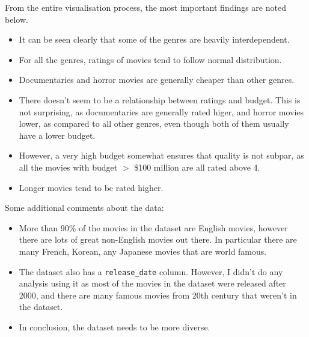 \documentclass[10pt]{article}
\begin{document}
\begin{multicols}{2}
From the entire visualisation process, the most important findings are noted below.

\begin{itemize}
\item It can be seen clearly that some of the genres are heavily interdependent.
\item For all the genres, ratings of movies tend to follow normal distribution. 
\item Documentaries and horror movies are generally cheaper than other genres.
\item There doesn't seem to be a relationship between ratings and budget. 
This is not surprising, as documentaries are generally rated higer, and horror movies lower, as compared to all other genres, even though both of them usually have a lower budget.
\item However, a very high budget somewhat ensures that quality is not subpar, as all the movies with budget $>$ \$100 million are all rated above 4.
\item Longer movies tend to be rated higher.
\end{itemize}

Some additional comments about the data:
\begin{itemize}
    \item More than 90\% of the movies in the dataset are English movies, however there are lots of great non-English movies out there. 
    In particular there are many French, Korean, any Japanese movies that are world famous. 
    \item The dataset also has a \texttt{release\_date} column. However, I didn't do any analysis using it as most of the movies in the dataset were released after 2000, and there are many famous movies from 20th century that weren't in the dataset.
    \item In conclusion, the dataset needs to be more diverse. 
\end{itemize}

\end{multicols}
\end{document}
